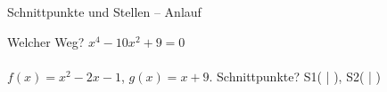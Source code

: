 \setcounter{aufgabe}{0}

\begin{aufgabe}{Schnittpunkte und Stellen – Anlauf}
\begin{teile}
\teil Welcher Weg? $x^4 - 10x^2 + 9 = 0$  \\  \\ 
\teil $f(x) = x^2 - 2x - 1$, $g(x) = x + 9$. Schnittpunkte? S1( \leerfeld | \leerfeld ), S2( \leerfeld | \leerfeld )
\end{teile}
\end{aufgabe}

